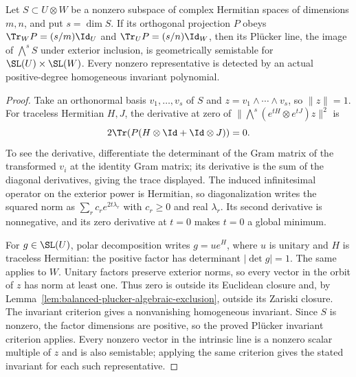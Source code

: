 \begin{lemma}
\label{lem:balanced-plucker}
\leanok
{}
Let $S\subset U\otimes W$ be a nonzero subspace of complex Hermitian
spaces of dimensions $m,n$, and put $s=\dim S$. If its orthogonal
projection $P$ obeys
$\Tr_W P=(s/m)\Id_U$ and $\Tr_U P=(s/n)\Id_W$, then its Pl\"ucker
line, the image of $\bigwedge^s S$ under exterior inclusion, is geometrically
semistable for $\SL(U)\times\SL(W)$. Every nonzero representative is
detected by an actual positive-degree homogeneous invariant polynomial.
\end{lemma}
\begin{proof}
Take an orthonormal basis $v_1,\ldots,v_s$ of $S$ and
$z=v_1\wedge\cdots\wedge v_s$, so $\|z\|=1$.
For traceless Hermitian $H,J$, the derivative at zero of
$\|\bigwedge^s(e^{tH}\otimes e^{tJ})z\|^2$ is
\[
 2\Tr(P(H\otimes\Id+\Id\otimes J))=0.
\]
To see the derivative, differentiate the determinant of the Gram
matrix of the transformed $v_i$ at the identity Gram matrix; its
derivative is the sum of the diagonal derivatives, giving the trace
displayed. The induced infinitesimal operator on the exterior power
is Hermitian, so diagonalization writes the squared norm as
$\sum_r c_r e^{2t\lambda_r}$ with $c_r\geq0$ and real $\lambda_r$.
Its second derivative is nonnegative, and its zero derivative at
$t=0$ makes $t=0$ a global minimum.

For $g\in\SL(U)$, polar decomposition writes $g=u e^H$, where $u$
is unitary and $H$ is traceless Hermitian: the positive factor has
determinant $|\det g|=1$. The same applies to $W$. Unitary factors
preserve exterior norms, so every vector in the orbit of $z$ has norm
at least one. Thus zero is outside its Euclidean closure and, by
Lemma~\ref{lem:balanced-plucker-algebraic-exclusion}, outside its Zariski
closure. The invariant criterion gives
a nonvanishing homogeneous invariant. Since $S$ is nonzero, the factor
dimensions are positive, so the proved Pl\"ucker invariant criterion applies.
Every nonzero vector in the intrinsic line is a nonzero scalar multiple of
$z$ and is also semistable; applying the same criterion gives the stated
invariant for each such representative.
\end{proof}

